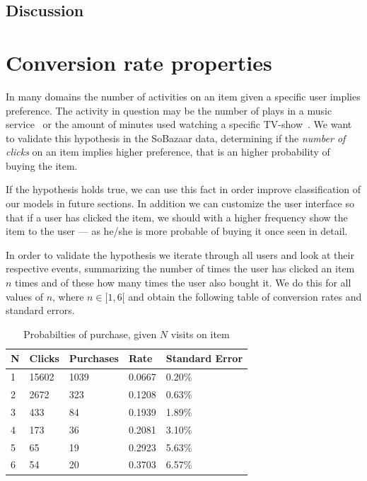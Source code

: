 \subsection{Discussion}


\clearpage
\section{Conversion rate properties}
\label{sec:conv-rate}

In many domains the number of activities on an item given a specific user
implies preference. The activity in question may be the number of plays in a
music service~\cite{parra2011walk} or the amount of minutes used watching a
specific TV-show~\cite{study-on-implicit-tv}. We want to validate this
hypothesis in the SoBazaar data, determining if the \textit{number of clicks}
on an item implies higher preference, that is an higher probability of buying
the item.



If the hypothesis holds true, we can use this fact in order improve
classification of our models in future sections. In addition we can customize
the user interface so that if a user has clicked the item, we should with a
higher frequency show the item to the user --- as he/she is more probable of
buying it once seen in detail.

In order to validate the hypothesis we iterate through all users and look at
their respective events, summarizing the number of times the user has clicked
an item $n$ times and of these how many times the user also bought it. We do
this for all values of $n$, where $n \in [1,6[$ and obtain the following table
of conversion rates and standard errors.

\begin{table}[H]
  \centering
  \begin{tabular}{lllll}
    \toprule
    N & Clicks & Purchases & Rate & Standard Error \\
    \midrule
    1 & 15602 & 1039  & 0.0667 & 0.20\% \\
    2 & 2672  & 323   & 0.1208 & 0.63\% \\
    3 & 433   & 84    & 0.1939 & 1.89\% \\
    4 & 173   & 36    & 0.2081 & 3.10\% \\
    5 & 65    & 19    & 0.2923 & 5.63\% \\
    6 & 54    & 20    & 0.3703 & 6.57\% \\
    \bottomrule
  \end{tabular}
  \label{tab:prob-purchase}
  \caption{Probabilties of purchase, given $N$ visits on item}
\end{table}

